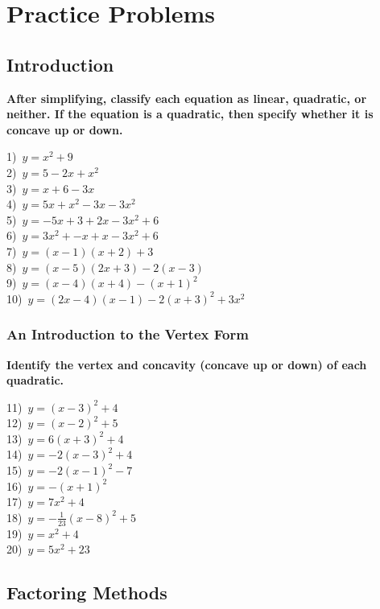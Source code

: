 \documentclass[12pt]{book}
\theoremstyle{definition}
\begin{document}
\section{Practice Problems}
\subsection*{Introduction}
{\bf After simplifying, classify each equation as linear, quadratic, or neither.  If the equation is a quadratic, then specify whether it is concave up or down.}

\begin{multicols}{2}
  1)~$y=x^2 + 9$\\
	2)~$y=5-2x+x^2$\\
	3)~$y=x+6-3x$\\
	4)~$y=5x+x^2-3x-3x^2$\\
	5)~$y=-5x+3+2x-3x^2+6$\\
  6)~$y=3x^2+-x+x-3x^2+6$\\
  7)~$y=(x-1)(x+2)+3$\\
  8)~$y=(x-5)(2x+3)-2(x-3)$\\
  9)~$y=(x-4)(x+4)-(x+1)^2$\\
  10)~$y=(2x-4)(x-1)-2(x+3)^2+3x^2$
\end{multicols}

\subsubsection{An Introduction to the Vertex Form} 

{\bf Identify the vertex and concavity (concave up or down) of each quadratic.}

\begin{multicols}{3}
  11)~$y=(x-3)^2+4$\\
  12)~$y=(x-2)^2+5$\\
  13)~$y=6(x+3)^2+4$\\
  14)~$y=-2(x-3)^2+4$\\
  15)~$y=-2(x-1)^2-7$\\
  16)~$y=-(x+1)^2$\\
  17)~$y=7x^2+4$\\
  18)~$y=-\frac{1}{23}(x-8)^2+5$\\
  19)~$y=x^2+4$\\
  20)~$y=5x^2+23$
\end{multicols}

\subsection*{Factoring Methods}
\end{document}
